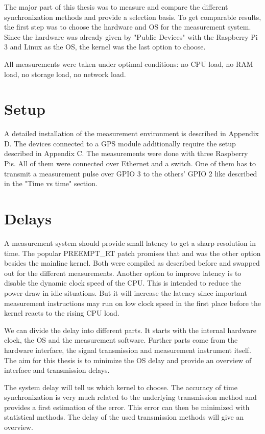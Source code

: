 The major part of this thesis was to measure and compare the different synchronization methods and provide a selection basis. To get comparable results, the first step was to choose the hardware and OS for the measurement system. Since the hardware was already given by "Public Devices" with the Raspberry Pi 3 and Linux as the OS, the kernel was the last option to choose.

All measurements were taken under optimal conditions: no CPU load, no RAM load, no storage load, no network load.

\section{Setup}

A detailed installation of the measurement environment is described in Appendix D. The devices connected to a GPS module additionally require the setup described in Appendix C.
The measurements were done with three Raspberry Pis. All of them were connected over Ethernet and a switch. One of them has to transmit a measurement pulse over GPIO 3 to the others’ GPIO 2 like described in the "Time vs time" section.

\section{Delays}

A measurement system should provide small latency to get a sharp resolution in time. The popular PREEMPT\_RT patch promises that and was the other option besides the mainline kernel. Both were compiled as described before and swapped out for the different measurements.
Another option to improve latency is to disable the dynamic clock speed of the CPU. This is intended to reduce the power draw in idle situations. But it will increase the latency since important measurement instructions may run on low clock speed in the first place before the kernel reacts to the rising CPU load.

We can divide the delay into different parts. It starts with the internal hardware clock, the OS and the measurement software. Further parts come from the hardware interface, the signal transmission and measurement instrument itself. The aim for this thesis is to minimize the OS delay and provide an overview of interface and transmission delays.

The system delay will tell us which kernel to choose. The accuracy of time synchronization is very much related to the underlying transmission method and provides a first estimation of the error. This error can then be minimized with statistical methods. The delay of the used transmission methods will give an overview.

